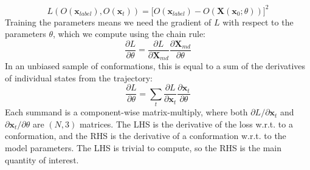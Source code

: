 \documentclass{article}
\begin{document}
\begin{equation}
L(O(\bm{x}_{label}), O(\bm{x}_t)) = \lbrack O(\bm{x}_{label}) - O(\bm{X}(\bm{x}_0;\theta)) \rbrack ^2
\end{equation}
Training the parameters means we need the gradient of $L$ with respect to the parameters $\theta$, which we compute using the chain rule:
\begin{equation}
\dfrac {\partial L}{\partial \theta} = \dfrac{\partial L}{\partial \bm{X}_{md}} \dfrac{\partial \bm{X}_{md}}{\partial \theta}
\end{equation}
In an unbiased sample of conformations, this is equal to a sum of the derivatives of individual states from the trajectory:
\begin{equation}
\dfrac {\partial L}{\partial \theta} = \sum_{t}{\dfrac{\partial L}{\partial \bm{x}_t} \dfrac{\partial \bm{x}_t}{\partial \theta}}
\end{equation}
Each summand is a component-wise matrix-multiply, where both $\partial L / \partial \bm{x}_t$ and ${\partial \bm{x}_t}/{\partial \theta}$ are $(N, 3)$ matrices. The LHS is the derivative of the loss w.r.t. to a conformation, and the RHS is the derivative of a conformation w.r.t. to the model parameters. The LHS is trivial to compute, so the RHS is the main quantity of interest.
\end{document}
